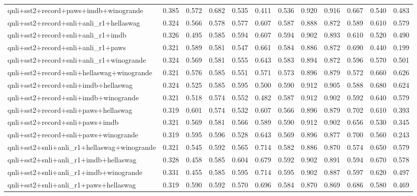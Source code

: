 \begin{table}[t]
\begin{tabular}{lrrrrrrrrrrr}
    qnli+sst2+record+paws+imdb+winogrande & 0.385 & 0.572 & 0.682 & 0.535 & 0.411 & 0.536 & 0.920 & 0.916 & 0.667 & 0.540 & 0.483 \\
    qnli+sst2+record+snli+anli\_r1+hellaswag & 0.324 & 0.566 & 0.578 & 0.577 & 0.607 & 0.587 & 0.888 & 0.872 & 0.589 & 0.610 & 0.579 \\
    qnli+sst2+record+snli+anli\_r1+imdb & 0.326 & 0.495 & 0.585 & 0.594 & 0.607 & 0.594 & 0.902 & 0.893 & 0.610 & 0.520 & 0.490 \\
    qnli+sst2+record+snli+anli\_r1+paws & 0.321 & 0.589 & 0.581 & 0.547 & 0.661 & 0.584 & 0.886 & 0.872 & 0.690 & 0.440 & 0.199 \\
    qnli+sst2+record+snli+anli\_r1+winogrande & 0.324 & 0.569 & 0.581 & 0.555 & 0.643 & 0.583 & 0.894 & 0.872 & 0.596 & 0.570 & 0.501 \\
    qnli+sst2+record+snli+hellaswag+winogrande & 0.321 & 0.576 & 0.585 & 0.551 & 0.571 & 0.573 & 0.896 & 0.879 & 0.572 & 0.660 & 0.626 \\
    qnli+sst2+record+snli+imdb+hellaswag & 0.324 & 0.525 & 0.585 & 0.595 & 0.500 & 0.590 & 0.912 & 0.905 & 0.588 & 0.680 & 0.624 \\
    qnli+sst2+record+snli+imdb+winogrande & 0.321 & 0.518 & 0.574 & 0.552 & 0.482 & 0.587 & 0.912 & 0.902 & 0.592 & 0.640 & 0.579 \\
    qnli+sst2+record+snli+paws+hellaswag & 0.319 & 0.601 & 0.574 & 0.532 & 0.607 & 0.566 & 0.896 & 0.879 & 0.702 & 0.610 & 0.393 \\
    qnli+sst2+record+snli+paws+imdb & 0.321 & 0.569 & 0.581 & 0.566 & 0.589 & 0.590 & 0.912 & 0.902 & 0.656 & 0.530 & 0.345 \\
    qnli+sst2+record+snli+paws+winogrande & 0.319 & 0.595 & 0.596 & 0.528 & 0.643 & 0.569 & 0.896 & 0.877 & 0.700 & 0.560 & 0.243 \\
    qnli+sst2+snli+anli\_r1+hellaswag+winogrande & 0.321 & 0.545 & 0.592 & 0.565 & 0.714 & 0.582 & 0.886 & 0.870 & 0.574 & 0.650 & 0.579 \\
    qnli+sst2+snli+anli\_r1+imdb+hellaswag & 0.328 & 0.458 & 0.585 & 0.604 & 0.679 & 0.592 & 0.902 & 0.891 & 0.594 & 0.670 & 0.578 \\
    qnli+sst2+snli+anli\_r1+imdb+winogrande & 0.331 & 0.455 & 0.585 & 0.595 & 0.714 & 0.595 & 0.902 & 0.887 & 0.597 & 0.620 & 0.497 \\
    qnli+sst2+snli+anli\_r1+paws+hellaswag & 0.319 & 0.590 & 0.592 & 0.570 & 0.696 & 0.584 & 0.870 & 0.869 & 0.686 & 0.580 & 0.469 \\

\end{tabular}
\end{table}
